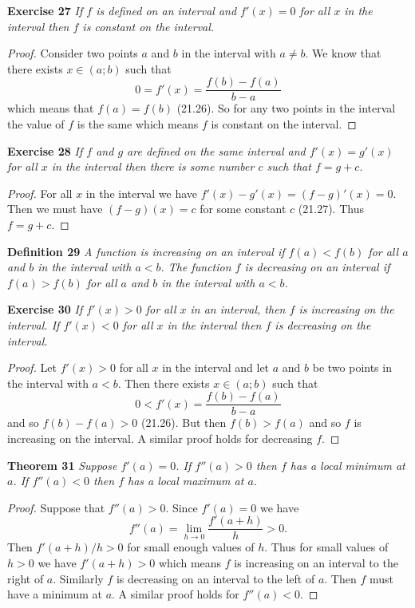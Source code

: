 \documentclass{article}
\begin{document}
\begin{flushleft}
\textbf{Exercise 27}
\textsl{If $f$ is defined on an interval and $f'(x) = 0$ for all $x$ in the interval then $f$ is constant on the interval.}
\begin{proof}
Consider two points $a$ and $b$ in the interval with $a \neq b$. We know that there exists $x \in (a;b)$ such that
\[
0 = f'(x) = \frac{f(b) - f(a)}{b-a}
\]
which means that $f(a) = f(b)$ (21.26). So for any two points in the interval the value of $f$ is the same which means $f$ is constant on the interval.
\end{proof}

\textbf{Exercise 28}
\textsl{If $f$ and $g$ are defined on the same interval and $f'(x) = g'(x)$ for all $x$ in the interval then there is some number $c$ such that $f = g + c$.}
\begin{proof}
For all $x$ in the interval we have $f'(x) - g'(x) = (f-g)' (x) = 0$. Then we must have $(f-g) (x) = c$ for some constant $c$ (21.27). Thus $f = g + c$.
\end{proof}

\textbf{Definition 29}
\textsl{A function is increasing on an interval if $f(a) < f(b)$ for all $a$ and $b$ in the interval with $a < b$. The function $f$ is decreasing on an interval if $f(a) > f(b)$ for all $a$ and $b$ in the interval with $a < b$.}\newline

\textbf{Exercise 30}
\textsl{If $f'(x) > 0$ for all $x$ in an interval, then $f$ is increasing on the interval. If $f'(x) < 0$ for all $x$ in the interval then $f$ is decreasing on the interval.}
\begin{proof}
Let $f'(x) > 0$ for all $x$ in the interval and let $a$ and $b$ be two points in the interval with $a < b$. Then there exists $x \in (a;b)$ such that
\[
0 < f'(x) = \frac{f(b) - f(a)}{b-a}
\]
and so $f(b) - f(a) > 0$ (21.26). But then $f(b) > f(a)$ and so $f$ is increasing on the interval. A similar proof holds for decreasing $f$.
\end{proof}

\textbf{Theorem 31}
\textsl{Suppose $f'(a) = 0$. If $f''(a) > 0$ then $f$ has a local minimum at $a$. If $f''(a) < 0$ then $f$ has a local maximum at $a$.}
\begin{proof}
Suppose that $f''(a) > 0$. Since $f'(a) = 0$ we have
\[
f'' (a) = \lim_{h \rightarrow 0} \frac{f'(a+h)}{h} > 0.
\]
Then $f'(a+h)/h > 0$ for small enough values of $h$. Thus for small values of $h > 0$ we have $f'(a+h) > 0$ which means $f$ is increasing on an interval to the right of $a$. Similarly $f$ is decreasing on an interval to the left of $a$. Then $f$ must have a minimum at $a$. A similar proof holds for $f''(a) < 0$.
\end{proof}


\end{flushleft}
\end{document}
